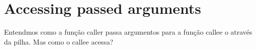 \section{Accessing passed arguments}
\myindex{\Stack}


Entendmos como a função \gls{caller} passa argumentos para a função \gls{callee} o através da pilha.
Mas como o \gls{callee} acessa?




%
%
%

